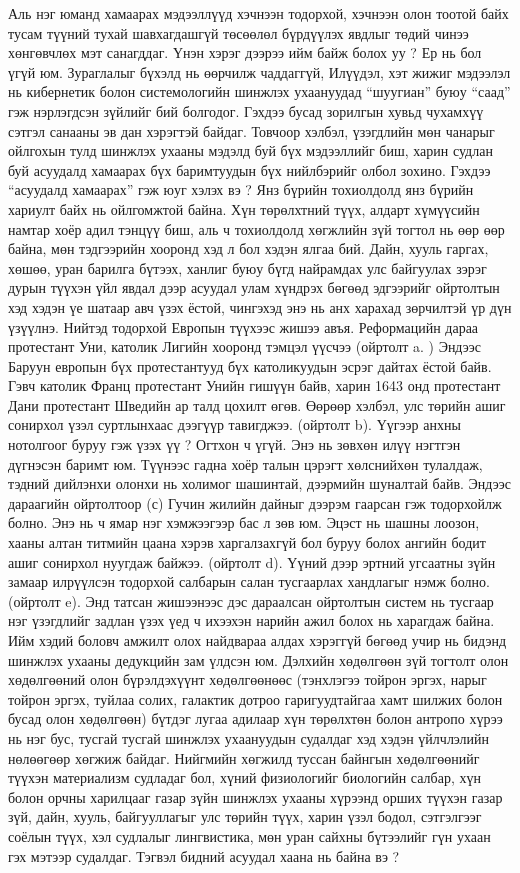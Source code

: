 Аль нэг юманд хамаарах мэдээллүүд хэчнээн тодорхой, хэчнээн олон тоотой байх тусам түүний тухай шавхагдашгүй төсөөлөл бүрдүүлэх явдлыг төдий чинээ хөнгөвчлөх мэт санагддаг. Үнэн хэрэг дээрээ ийм байж болох уу ? Ер нь бол үгүй юм. Зураглалыг бүхэлд нь өөрчилж чаддаггүй, Илүүдэл, хэт жижиг мэдээлэл нь кибернетик болон системологийн шинжлэх ухаануудад “шуугиан” буюу “саад” гэж нэрлэгдсэн зүйлийг бий болгодог. Гэхдээ бусад зорилгын хувьд чухамхүү сэтгэл санааны эв дан хэрэгтэй байдаг. Товчоор хэлбэл, үзэгдлийн мөн чанарыг ойлгохын тулд шинжлэх ухааны мэдэлд буй бүх мэдээллийг биш, харин судлан буй асуудалд хамаарах бүх баримтуудын бүх нийлбэрийг олбол зохино.
Гэхдээ “асуудалд хамаарах” гэж юуг хэлэх вэ ? Янз бүрийн тохиолдолд янз бүрийн хариулт байх нь ойлгомжтой байна. Хүн төрөлхтний түүх, алдарт хүмүүсийн намтар хоёр адил тэнцүү биш, аль ч тохиолдолд хөгжлийн зүй тогтол нь өөр өөр байна, мөн тэдгээрийн хооронд хэд л бол хэдэн ялгаа бий. Дайн, хууль гаргах, хөшөө, уран барилга бүтээх, ханлиг буюу бүгд найрамдах улс байгуулах зэрэг дурын түүхэн үйл явдал дээр асуудал улам хүндрэх бөгөөд эдгээрийг ойртолтын хэд хэдэн үе шатаар авч үзэх ёстой, чингэхэд энэ нь анх харахад зөрчилтэй үр дүн үзүүлнэ.
Нийтэд тодорхой Европын түүхээс жишээ авъя. Реформацийн дараа протестант Уни, католик Лигийн хооронд тэмцэл үүсчээ (ойртолт a. ) Эндээс Баруун европын бүх протестантууд бүх католикуудын эсрэг дайтах ёстой байв. Гэвч католик Франц протестант Унийн гишүүн байв, харин 1643 онд протестант Дани протестант Шведийн ар талд цохилт өгөв. Өөрөөр хэлбэл, улс төрийн ашиг сонирхол үзэл суртлынхаас дээгүүр тавигджээ. (ойртолт b). Үүгээр анхны нотолгоог буруу гэж үзэх үү ? Огтхон ч үгүй. Энэ нь зөвхөн илүү нэгтгэн дүгнэсэн баримт юм. Түүнээс гадна хоёр талын цэрэгт хөлснийхөн тулалдаж, тэдний дийлэнхи олонхи нь холимог шашинтай, дээрмийн шуналтай байв. Эндээс дараагийн ойртолтоор (с) Гучин жилийн дайныг дээрэм гаарсан гэж тодорхойлж болно. Энэ нь ч ямар нэг хэмжээгээр бас л зөв юм. Эцэст нь шашны лоозон, хааны алтан титмийн цаана хэрэв харгалзахгүй бол буруу болох ангийн бодит ашиг сонирхол нуугдаж байжээ. (ойртолт d). Үүний дээр эртний угсаатны зүйн замаар илрүүлсэн тодорхой салбарын салан тусгаарлах хандлагыг нэмж болно. (ойртолт e).
Энд татсан жишээнээс дэс дараалсан ойртолтын систем нь тусгаар нэг үзэгдлийг задлан үзэх үед ч ихээхэн нарийн ажил болох нь харагдаж байна. Ийм хэдий боловч амжилт олох найдвараа алдах хэрэггүй бөгөөд учир нь бидэнд шинжлэх ухааны дедукцийн зам үлдсэн юм. Дэлхийн хөдөлгөөн зүй тогтолт олон хөдөлгөөний олон бүрэлдэхүүнт хөдөлгөөнөөс (тэнхлэгээ тойрон эргэх, нарыг тойрон эргэх, туйлаа солих, галактик дотроо гаригуудтайгаа хамт шилжих болон бусад олон хөдөлгөөн) бүтдэг лугаа адилаар хүн төрөлхтөн болон антропо хүрээ нь нэг бус, тусгай тусгай шинжлэх ухаануудын судалдаг хэд хэдэн үйлчлэлийн нөлөөгөөр хөгжиж байдаг. Нийгмийн хөгжилд туссан байнгын хөдөлгөөнийг түүхэн материализм судладаг бол, хүний физиологийг биологийн салбар, хүн болон орчны харилцааг газар зүйн шинжлэх ухааны хүрээнд орших түүхэн газар зүй, дайн, хууль, байгууллагыг улс төрийн түүх, харин үзэл бодол, сэтгэлгээг соёлын түүх, хэл судлалыг лингвистика, мөн уран сайхны бүтээлийг гүн ухаан гэх мэтээр судалдаг. Тэгвэл бидний асуудал хаана нь байна вэ ?
